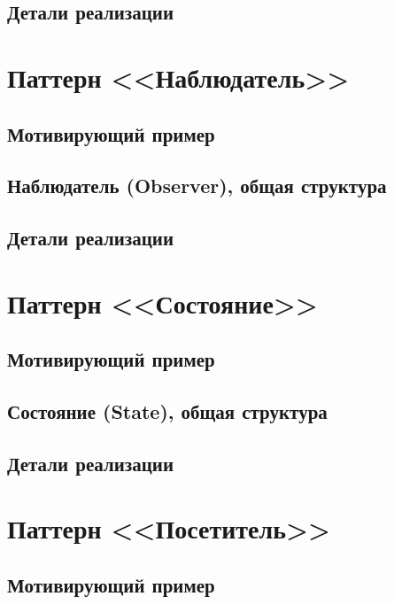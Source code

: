 \documentclass[a5paper]{article}
\begin{document}
\subsection{Детали реализации}



\section{Паттерн <<Наблюдатель>>}

\subsection{Мотивирующий пример}

\subsection{Наблюдатель (Observer), общая структура}

\subsection{Детали реализации}



\section{Паттерн <<Состояние>>}

\subsection{Мотивирующий пример}

\subsection{Состояние (State), общая структура}

\subsection{Детали реализации}



\section{Паттерн <<Посетитель>>}

\subsection{Мотивирующий пример}
\end{document}
